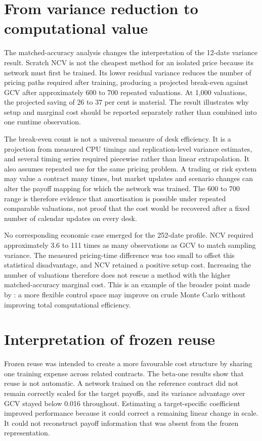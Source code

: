 \section{From variance reduction to computational value}

The matched-accuracy analysis changes the interpretation of the 12-date variance result. Scratch NCV is not the cheapest method for an isolated price because its network must first be trained. Its lower residual variance reduces the number of pricing paths required after training, producing a projected break-even against GCV after approximately 600 to 700 repeated valuations. At 1{,}000 valuations, the projected saving of 26 to 37 per cent is material. The result illustrates why setup and marginal cost should be reported separately rather than combined into one runtime observation.

The break-even count is not a universal measure of desk efficiency. It is a projection from measured CPU timings and replication-level variance estimates, and several timing series required piecewise rather than linear extrapolation. It also assumes repeated use for the same pricing problem. A trading or risk system may value a contract many times, but market updates and scenario changes can alter the payoff mapping for which the network was trained. The 600 to 700 range is therefore evidence that amortisation is possible under repeated comparable valuations, not proof that the cost would be recovered after a fixed number of calendar updates on every desk.

No corresponding economic case emerged for the 252-date profile. NCV required approximately 3.6 to 111 times as many observations as GCV to match sampling variance. The measured pricing-time difference was too small to offset this statistical disadvantage, and NCV retained a positive setup cost. Increasing the number of valuations therefore does not rescue a method with the higher matched-accuracy marginal cost. This is an example of the broader point made by \textcite{portier_segers_2019}: a more flexible control space may improve on crude Monte Carlo without improving total computational efficiency.

\section{Interpretation of frozen reuse}

Frozen reuse was intended to create a more favourable cost structure by sharing one training expense across related contracts. The beta-one results show that reuse is not automatic. A network trained on the reference contract did not remain correctly scaled for the target payoffs, and its variance advantage over GCV stayed below 0.016 throughout. Estimating a target-specific coefficient improved performance because it could correct a remaining linear change in scale. It could not reconstruct payoff information that was absent from the frozen representation.

